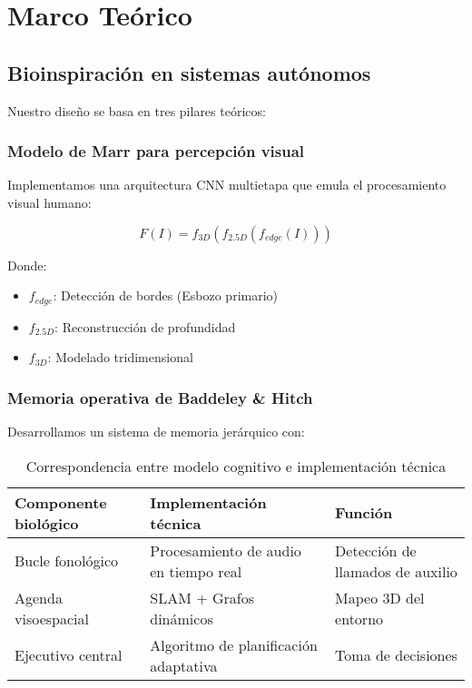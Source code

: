 \documentclass[journal]{new-aiaa}
\begin{document}
\section{Marco Teórico}
\subsection{Bioinspiración en sistemas autónomos}
Nuestro diseño se basa en tres pilares teóricos:

\subsubsection{Modelo de Marr para percepción visual}
Implementamos una arquitectura CNN multietapa que emula el procesamiento visual humano:

\begin{equation}
F(I) = f_{3D}(f_{2.5D}(f_{edge}(I)))
\end{equation}

Donde:
\begin{itemize}
\item $f_{edge}$: Detección de bordes (Esbozo primario)
\item $f_{2.5D}$: Reconstrucción de profundidad
\item $f_{3D}$: Modelado tridimensional
\end{itemize}

\subsubsection{Memoria operativa de Baddeley \& Hitch}
Desarrollamos un sistema de memoria jerárquico con:

\begin{table}[h]
\centering
\caption{Correspondencia entre modelo cognitivo e implementación técnica}

\begin{tabularx}{\textwidth}{|l|X|X|}
\hline
\textbf{Componente biológico} & \textbf{Implementación técnica} & \textbf{Función} \\
\hline
Bucle fonológico & Procesamiento de audio en tiempo real & Detección de llamados de auxilio \\
\hline
Agenda visoespacial & SLAM + Grafos dinámicos & Mapeo 3D del entorno \\
\hline
Ejecutivo central & Algoritmo de planificación adaptativa & Toma de decisiones \\
\hline
\end{tabularx}
\end{table}
\end{document}
